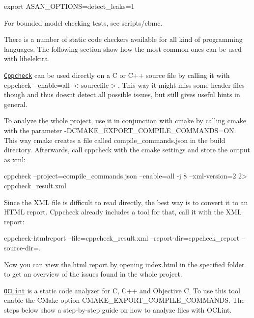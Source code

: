 \begin{DoxyCode}
export ASAN\_OPTIONS=detect\_leaks=1
\end{DoxyCode}


For bounded model checking tests, see {\ttfamily scripts/cbmc}.

There is a number of static code checkers available for all kind of programming languages. The following section show how the most common ones can be used with {\ttfamily libelektra}.

\href{http://cppcheck.sourceforge.net/}{\tt Cppcheck} can be used directly on a C or C++ source file by calling it with {\ttfamily cppcheck -\/-\/enable=all $<$sourcefile$>$}. This way it might miss some header files though and thus doesn\textquotesingle{}t detect all possible issues, but still gives useful hints in general.

To analyze the whole project, use it in conjunction with {\ttfamily cmake} by calling {\ttfamily cmake} with the parameter {\ttfamily -\/\+D\+C\+M\+A\+K\+E\+\_\+\+E\+X\+P\+O\+R\+T\+\_\+\+C\+O\+M\+P\+I\+L\+E\+\_\+\+C\+O\+M\+M\+A\+N\+DS=ON}. This way {\ttfamily cmake} creates a file called {\ttfamily compile\+\_\+commands.\+json} in the build directory. Afterwards, call {\ttfamily cppcheck} with the cmake settings and store the output as xml\+:


\begin{DoxyCode}
cppcheck --project=compile\_commands.json --enable=all -j 8 --xml-version=2 2> cppcheck\_result.xml
\end{DoxyCode}


Since the X\+ML file is difficult to read directly, the best way is to convert it to an H\+T\+ML report. Cppcheck already includes a tool for that, call it with the X\+ML report\+:


\begin{DoxyCode}
cppcheck-htmlreport --file=cppcheck\_result.xml --report-dir=cppcheck\_report --source-dir=.
\end{DoxyCode}


Now you can view the html report by opening {\ttfamily index.\+html} in the specified folder to get an overview of the issues found in the whole project.

\href{http://oclint.org/}{\tt O\+C\+Lint} is a static code analyzer for C, C++ and Objective C. To use this tool enable the C\+Make option {\ttfamily C\+M\+A\+K\+E\+\_\+\+E\+X\+P\+O\+R\+T\+\_\+\+C\+O\+M\+P\+I\+L\+E\+\_\+\+C\+O\+M\+M\+A\+N\+DS}. The steps below show a step-\/by-\/step guide on how to analyze files with O\+C\+Lint.


